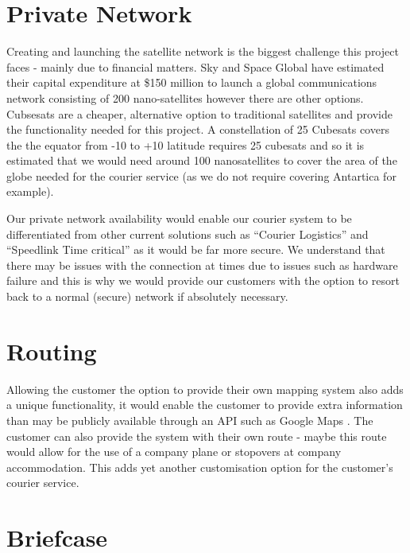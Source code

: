 


\section{Private Network}

Creating and launching the satellite network is the biggest challenge this project faces - mainly due to financial matters. Sky and Space Global have estimated their capital expenditure at \$150 million to launch a global communications network consisting of 200 nano-satellites however there are other options. Cubsesats \cite{cubsesat} are a cheaper, alternative option to traditional satellites and provide the functionality needed for this project. A constellation of 25 Cubesats covers the the equator from -10 to +10 latitude requires 25 cubesats \cite{narayanasamy2017nanosatellites} and so it is estimated that we would need around 100 nanosatellites to cover the area of the globe needed for the courier service (as we do not require covering Antartica for example).

Our private network availability would enable our courier system to be differentiated from other current solutions such as “Courier Logistics” \cite{courierlogistics_2019} and “Speedlink Time critical” \cite{speedlinktc} as it would be far more secure. We understand that there may be issues with the connection at times due to issues such as hardware failure and this is why we would provide our customers with the option to resort back to a normal (secure) network if absolutely necessary. 

\section{Routing}

Allowing the customer the option to provide their own mapping system also adds a unique functionality, it would enable the customer to provide extra information than may be publicly available through an API such as Google Maps \cite{GoogleMaps}. The customer can also provide the system with their own route - maybe this route would allow for the use of a company plane  or stopovers at company accommodation. This adds yet another customisation option for the customer's courier service.

\section{Briefcase} \label{briefcasemarket}

